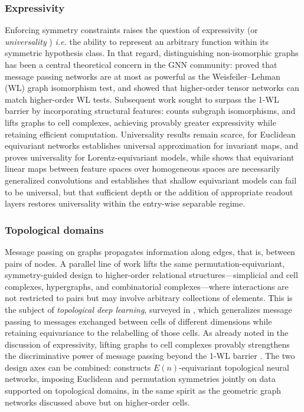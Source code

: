 \documentclass[mathematics,review,submit,moreauthors]{Definitions/mdpi}
\begin{document}
\subsubsection{Expressivity}
Enforcing symmetry constraints raises the question of expressivity (or \textit{universality} \citep{maass2024}) \textit{i.e.} the ability to represent an arbitrary function within its symmetric hypothesis class.
In that regard, distinguishing non-isomorphic graphs has been a central theoretical concern in the GNN community: \citet{xu2019} proved that message passing networks are at most as powerful as the Weisfeiler--Lehman (WL) graph isomorphism test, and \citet{maron2020} showed that higher-order tensor networks can match higher-order WL tests.
Subsequent work sought to surpass the 1-WL barrier by incorporating structural features: \citet{bouritsas2021} counts subgraph isomorphisms, and \citet{bodnar2021a} lifts graphs to cell complexes, achieving provably greater expressivity while retaining efficient computation.
Universality results remain scarce, for Euclidean equivariant networks \citet{yarotsky2018r} establishes universal approximation for invariant maps, and \citet{bogatskiy2020p3icml} proves universality for Lorentz-equivariant models, while \citet{kondor2018p3icml} shows that equivariant linear maps between feature spaces over homogeneous spaces are necessarily generalized convolutions and \citet{pacini2026} establishes that shallow equivariant models can fail to be universal, but that sufficient depth or the addition of appropriate readout layers restores universality within the entry-wise separable regime.

\subsubsection{Topological domains}
Message passing on graphs propagates information along edges, that is, between pairs of nodes.
A parallel line of work lifts the same permutation-equivariant, symmetry-guided design to higher-order relational structures---simplicial and cell complexes, hypergraphs, and combinatorial complexes---where interactions are not restricted to pairs but may involve arbitrary collections of elements.
This is the subject of \emph{topological deep learning}, surveyed in \citet{papillon2023}, which generalizes message passing to messages exchanged between cells of different dimensions while retaining equivariance to the relabelling of those cells.
As already noted in the discussion of expressivity, lifting graphs to cell complexes provably strengthens the discriminative power of message passing beyond the 1-WL barrier \citep{bodnar2021a}.
The two design axes can be combined: \citet{battiloro2024} constructs $E(n)$-equivariant topological neural networks, imposing Euclidean and permutation symmetries jointly on data supported on topological domains, in the same spirit as the geometric graph networks discussed above but on higher-order cells.
\end{document}
